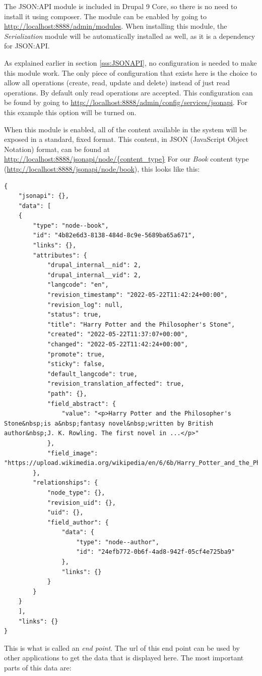 The JSON:API module is included in Drupal 9 Core, so there is no need to install it using composer. The module can be enabled by going to \url{http://localhost:8888/admin/modules}. When installing this module, the \emph{Serialization} module will be automatically installed as well, as it is a dependency for JSON:API.

As explained earlier in section \ref{sss:JSONAPI}, no configuration is needed to make this module work. The only piece of configuration that exists here is the choice to allow all operations (create, read, update and delete) instead of just read operations. By default only read operations are accepted. This configuration can be found by going to \url{http://localhost:8888/admin/config/services/jsonapi}. For this example this option will be turned on.

When this module is enabled, all of the content available in the system will be exposed in a standard, fixed format. This content, in JSON (JavaScript Object Notation) format, can be found at \url{http://localhost:8888/jsonapi/node/{content_type}} For our \emph{Book} content type (\url{http://localhost:8888/jsonapi/node/book}), this looks like this:

\begin{lstlisting}
{
	"jsonapi": {},
	"data": [
	{
		"type": "node--book",
		"id": "4b82e6d3-8138-484d-8c9e-5689ba65a671",
		"links": {},
		"attributes": {
			"drupal_internal__nid": 2,
			"drupal_internal__vid": 2,
			"langcode": "en",
			"revision_timestamp": "2022-05-22T11:42:24+00:00",
			"revision_log": null,
			"status": true,
			"title": "Harry Potter and the Philosopher's Stone",
			"created": "2022-05-22T11:37:07+00:00",
			"changed": "2022-05-22T11:42:24+00:00",
			"promote": true,
			"sticky": false,
			"default_langcode": true,
			"revision_translation_affected": true,
			"path": {},
			"field_abstract": {
				"value": "<p>Harry Potter and the Philosopher's Stone&nbsp;is a&nbsp;fantasy novel&nbsp;written by British author&nbsp;J. K. Rowling. The first novel in ...</p>"
			},
			"field_image": "https://upload.wikimedia.org/wikipedia/en/6/6b/Harry_Potter_and_the_Philosopher%27s_Stone_Book_Cover.jpg"
		},
		"relationships": {
			"node_type": {},
			"revision_uid": {},
			"uid": {},
			"field_author": {
				"data": {
					"type": "node--author",
					"id": "24efb772-0b6f-4ad8-942f-05cf4e725ba9"
				},
				"links": {}
			}
		}
	}
	],
	"links": {}
}
\end{lstlisting}

This is what is called an \emph{end point}. The url of this end point can be used by other applications to get the data that is displayed here. The most important parts of this data are:

